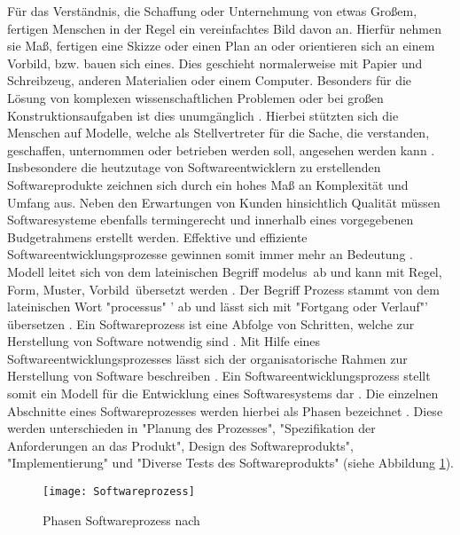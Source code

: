 Für das Verständnis, die Schaffung oder Unternehmung von etwas Großem, fertigen Menschen in der Regel ein vereinfachtes Bild davon an. Hierfür nehmen sie Maß, fertigen eine Skizze oder einen Plan an oder orientieren sich an einem Vorbild, bzw. bauen sich eines. Dies geschieht normalerweise mit Papier und Schreibzeug, anderen Materialien oder einem Computer. Besonders für die Lösung von komplexen wissenschaftlichen Problemen oder bei großen Konstruktionsaufgaben ist dies unumgänglich \cite{Hesse2008}. \newline
Hierbei stützten sich die Menschen auf Modelle, welche als Stellvertreter für die Sache, die verstanden, geschaffen, unternommen oder betrieben werden soll, angesehen werden kann \cite{Hesse2008}. \newline
Insbesondere die heutzutage von Softwareentwicklern zu erstellenden Softwareprodukte zeichnen sich durch ein hohes Maß an Komplexität und Umfang aus. Neben den Erwartungen von Kunden hinsichtlich Qualität müssen Softwaresysteme ebenfalls termingerecht und innerhalb eines vorgegebenen Budgetrahmens erstellt werden. Effektive und effiziente Softwareentwicklungsprozesse gewinnen somit immer mehr an Bedeutung \cite{Grechenig2010}.
Modell leitet sich von dem lateinischen Begriff  \glqq modelus\grqq \ 
ab und kann mit  \glqq Regel, Form, Muster, Vorbild\grqq \ übersetzt werden \cite{Hesse2008}. 
Der Begriff Prozess stammt von dem lateinischen Wort "processus" ' ab und lässt sich mit "Fortgang oder Verlauf"' übersetzen \cite{koch2011, Staud2006}. \newline 
Ein Softwareprozess ist eine Abfolge von Schritten, welche zur Herstellung von Software notwendig sind \cite{Mishra2012, Stoerrle2005}. Mit Hilfe eines Softwareentwicklungsprozesses lässt sich der organisatorische Rahmen zur Herstellung von Software beschreiben \cite{Koelmel2000}. Ein Softwareentwicklungsprozess stellt somit ein Modell für die Entwicklung eines Softwaresystems dar \cite{Hanser2010}. Die einzelnen Abschnitte eines Softwareprozesses werden hierbei als Phasen bezeichnet \cite{Stoerrle2005}. Diese werden unterschieden in "Planung des Prozesses", "Spezifikation der Anforderungen an das Produkt", Design des Softwareprodukts", "Implementierung" und "Diverse Tests des Softwareprodukts" (siehe Abbildung \ref{fig:SEProzess}).

\begin{figure}[htp]
\begin{center} 
  \texttt{[image: Softwareprozess]} %
  \caption{Phasen Softwareprozess nach \cite{Hanser2010}}
  \label{fig:SEProzess}
\end{center}
\end{figure}

